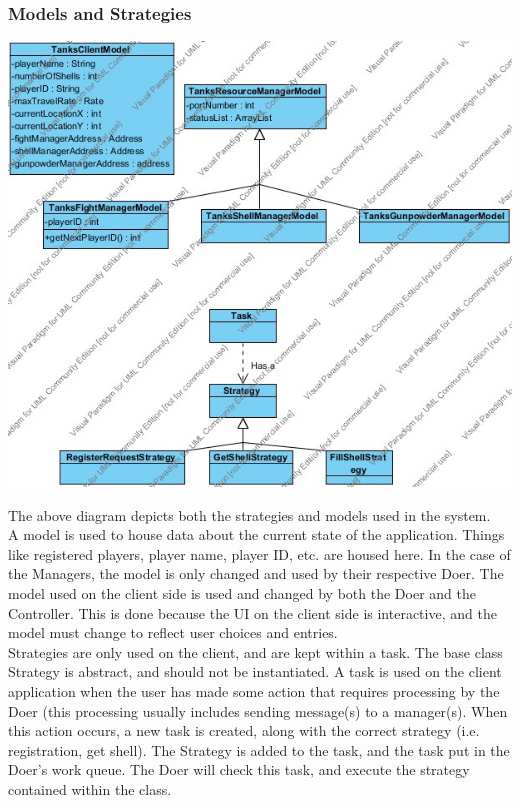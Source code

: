 \documentclass[12pt]{article}
\begin{document}
			\subsubsection{Models and Strategies}
				\begin{center}
					\includegraphics[width=\textwidth]{Diagrams/Structure Diagrams/ModelAndStrategyStructure.jpg}
				\end{center}
				\indent The above diagram depicts both the strategies and models used in the system. 
				\\A model is used to house data about the current state of the application. Things like registered players, player name, player ID, etc. are housed here. In the case of the Managers, the model is only changed and used by their respective Doer. The model used on the client side is used and changed by both the Doer and the Controller. This is done because the UI on the client side is interactive, and the model must change to reflect user choices and entries. 
				\\ Strategies are only used on the client, and are kept within a task. The base class Strategy is abstract, and should not be instantiated. A task is used on the client application when the user has made some action that requires processing by the Doer (this processing usually includes sending message(s) to a manager(s). When this action occurs, a new task is created, along with the correct strategy (i.e. registration, get shell). The Strategy is added to the task, and the task put in the Doer's work queue. The Doer will check this task, and execute the strategy contained within the class.
\end{document}
